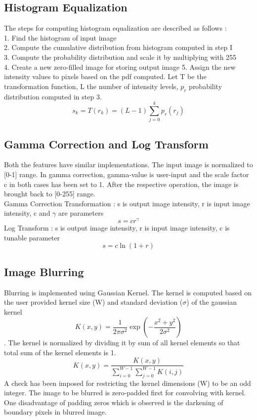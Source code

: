 \documentclass[letterpaper, 10 pt, conference]{ieeeconf}  %
\begin{document}
\subsection{\textbf{Histogram Equalization}}
The steps for computing histogram equalization are described as follows :\\
1. Find the histogram of input image \\
2. Compute the cumulative distribution from histogram computed in step I \\
3. Compute the probability distribution and scale it by multiplying with 255 \\
4. Create a new zero-filled image for storing output image
5. Assign the new intensity values to pixels based on the pdf computed. Let T be the transformation function, L the number of intensity levels, $p_r$ probability distribution computed in step 3.
\[s_{k} = T(r_{k}) = (L-1)\sum_{j=0}^{k}p_r(r_j) \] 

\subsection{\textbf{Gamma Correction and Log Transform}}
Both the features have similar implementations. The input image is normalized to [0-1] range. In gamma correction, gamma-value is user-input and the scale factor c in both cases has been set to 1. After the respective operation, the image is brought back to [0-255] range. \\
Gamma Correction Transformation : s is output image intensity, r is input image intensity, c and $\gamma$ are parameters \[ s = cr^{\gamma}\] Log Transform : s is output image intensity, r is input image intensity, c is tunable parameter\[ s = c\ln(1+r) \]

\subsection{\textbf{Image Blurring}}
Blurring is implemented using Gaussian Kernel. The kernel is computed based on the user provided kernel size (W) and standard deviation ($\sigma$) of the gaussian kernel
\[K(x, y) = \frac{1}{2\pi \sigma^2}\exp({-\frac{x^2 + y^2}{2\sigma^2}}) \]. The kernel is normalized by dividing it by sum of all kernel elements so that total sum of the kernel elements is 1. 
\[ K(x, y) = \frac{K(x, y)}{\sum_{i=0}^{W-1}\sum_{j=0}^{W-1}K(i, j)} \]A check has been imposed for restricting the kernel dimensions (W) to be an odd integer. The image to be blurred is zero-padded first for convolving with kernel. One disadvantage of padding zeros which is observed is the darkening of boundary pixels in blurred image. 
\end{document}
